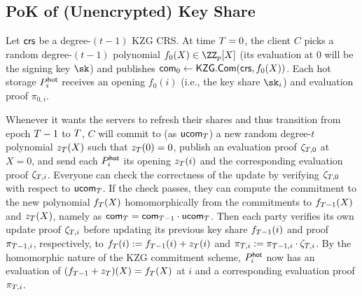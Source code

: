\subsection{PoK of (Unencrypted) Key Share}\label{subsec:unenc_pok}

Let $\mathsf{crs}$ be a degree-$(t-1)$ KZG CRS. At time $T=0$, the client $C$ picks a random degree-$(t-1)$ polynomial $f_0(X) \in \ZZ_p[X]$ (its evaluation at 0 will be the signing key $\sk$) and publishes $\mathsf{com}_0 \gets \mathsf{KZG}.\mathsf{Com}(\mathsf{crs}, f_0(X))$. 
Each hot storage $P_i^{\mathsf{hot}}$ receives an opening $f_0(i)$ (i.e., the key share $\sk_i$) and evaluation proof $\pi_{0,i}$. 

Whenever it wants the servers to refresh their shares and thus transition from epoch $T-1$ to $T$, $C$ will commit to (as $\mathsf{ucom}_{T}$) a new random degree-$t$ polynomial $z_{T}(X)$ such that $z_{T}(0) = 0$, publish an evaluation proof $\zeta_{T,0}$ at $X=0$, and send each $P_i^{\mathsf{hot}}$ its opening $z_{T}(i)$ and the corresponding evaluation proof $\zeta_{T,i}$. Everyone can check the correctness of the update by verifying $\zeta_{T,0}$ with respect to $\mathsf{ucom}_{T}$. If the check passes, they can compute the commitment to the new polynomial $f_{T}(X)$ homomorphically from the commitments to $f_{T-1}(X)$ and $z_{T}(X)$, namely as $\mathsf{com}_{T} = \mathsf{com}_{T-1} \cdot \mathsf{ucom}_{T}$.
Then each party verifies its own update proof $\zeta_{T,i}$ before updating its previous key share $f_{T-1}(i)$ and proof $\pi_{T-1,i}$, respectively, to $f_{T}(i) := f_{T-1}(i) + z_{T}(i)$ and $\pi_{T,i} := \pi_{T-1,i} \cdot \zeta_{T,i}$. By the homomorphic nature of the KZG commitment scheme, $P_i^{\mathsf{hot}}$ now has an evaluation of $(f_{T-1} + z_{T})(X) = f_{T}(X)$ at $i$ and a corresponding evaluation proof $\pi_{T,i}$. 

